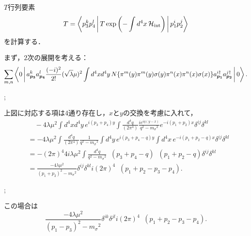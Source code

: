 $T$行列要素
\[ T = \Braket{ p_3^k p_4^l | T \exp\left( - \int d^4x\, \mathcal{H}_\text{int} \right) | p_1^i p_2^j } \]
を計算する．

まず，$2$次の展開を考える：
\[ \sum_{m, n} \Braket{ 0 | a_{\boldsymbol{p_3}}^k a_{\boldsymbol{p_4}}^l \frac{(-i)^2}{2!} (\sqrt{\lambda}\mu)^2 \int d^4x d^4y\,
N\{ \pi^m(y) \pi^m(y) \sigma(y) \pi^n(x) \pi^n(x) \sigma(x) \} a_{\boldsymbol{p_1}}^{i\dagger} a_{\boldsymbol{p_2}}^{j\dagger} | 0 } . \]

\begin{center}
  ;
\end{center}
上図に対応する項は$4$通り存在し，$x$と$y$の交換を考慮に入れて，
\begin{align*}
  &\quad -4\lambda\mu^2 \int d^4x d^4y \, e^{i(p_3+p_4)y} \int \frac{d^4q}{(2\pi^4)} \frac{ie^{iq(y-x)}}{q^2 - m_\sigma{}^2} e^{-i(p_1+p_2)x} \delta^{ij}\delta^{kl} \\
  &= -4\lambda\mu^2 \int \frac{d^4q}{(2\pi^4)} \frac{1}{q^2 - m_\sigma{}^2} \int d^4y \, e^{i(p_3+p_4-q)y} \int d^4x \, e^{-i(p_1+p_2-q)x} \delta^{ij}\delta^{kl} \\
  &= -(2\pi)^4 4i\lambda\mu^2 \int \frac{d^4q}{q^2 - m_\sigma{}^2} \mathop{\delta^{(4)}}(p_3+p_4-q) \mathop{\delta^{(4)}}(p_1+p_2-q) \delta^{ij}\delta^{kl} \\
  &= \frac{-4\lambda\mu^2}{(p_1+p_2)^2 - m_\sigma{}^2} \delta^{ij}\delta^{kl} i(2\pi)^4 \mathop{\delta^{(4)}}(p_1+p_2-p_3-p_4).
\end{align*}

\begin{center}
  ;
\end{center}
この場合は
\[ \frac{-4\lambda\mu^2}{(p_1-p_3)^2 - m_\sigma{}^2} \delta^{ik}\delta^{jl} i(2\pi)^4 \mathop{\delta^{(4)}}(p_1+p_2-p_3-p_4). \]

